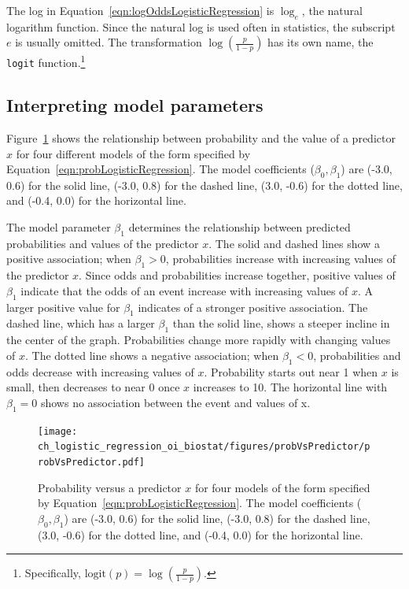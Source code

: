 The log in Equation~\ref{eqn:logOddsLogisticRegression} is $\log_e$, the natural logarithm function.  Since the natural log is used often in statistics, the subscript $e$ is usually omitted. The transformation $\log(\frac{p}{1-p})$ has its own name, the \texttt{logit} function.\footnote{Specifically, $\text{logit}(p) = \log(\frac{p}{1-p})$.}

\newpage
\subsection{Interpreting model parameters}

Figure~\ref{figure:probVsPredictor} shows the relationship between probability and the value of a predictor $x$ for four different models of the form specified by Equation~\ref{eqn:probLogisticRegression}. The model coefficients ($\beta_0, \beta_1$) are (-3.0, 0.6) for the solid line, (-3.0, 0.8) for the dashed line, (3.0, -0.6) for the dotted line, and (-0.4, 0.0) for the horizontal line.

The model parameter $\beta_1$ determines the relationship between predicted probabilities and values of the predictor $x$. The solid and dashed lines show a positive association; when $\beta_1 > 0$, probabilities increase with increasing values of the predictor $x$. Since odds and probabilities increase together, positive values of $\beta_1$ indicate that the odds of an event increase with increasing values of $x$. A larger positive value for $\beta_1$ indicates of a stronger positive association. The dashed line, which has a larger $\beta_1$ than the solid line, shows a steeper incline in the center of the graph. Probabilities change more rapidly with changing values of $x$. The dotted line shows a negative association; when $\beta_1 < 0$, probabilities and odds decrease with increasing values of $x$. Probability starts out near 1 when $x$ is small, then decreases to near 0 once $x$ increases to 10. The horizontal line with $\beta_1 = 0$ shows no association between the event and values of x.


\begin{figure}[!htb]
	\centering
	\texttt{[image: ch\_logistic\_regression\_oi\_biostat/figures/probVsPredictor/probVsPredictor.pdf]}
    \caption{Probability versus a predictor $x$ for four models of the form specified by Equation~\ref{eqn:probLogisticRegression}. The model coefficients ($\beta_0, \beta_1$) are (-3.0, 0.6) for the solid line, (-3.0, 0.8) for the dashed line, (3.0, -0.6) for the dotted line, and (-0.4, 0.0) for the horizontal line.}
    \label{figure:probVsPredictor}
\end{figure}


